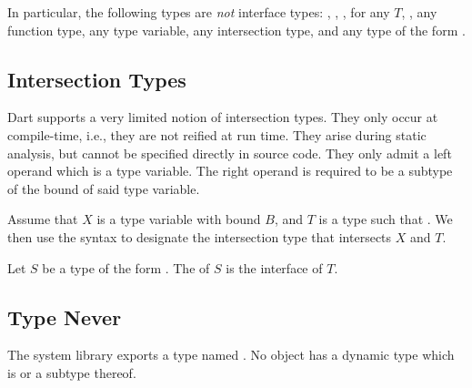 \documentclass[makeidx]{article}
\begin{document}
{{In particular, the following types are \emph{not} interface types:
\VOID, \DYNAMIC, \FUNCTION,  for any $T$, ,
any function type, any type variable, any intersection type,
and any type of the form .%
}


\subsection{Intersection Types}

\LMHash{}%
Dart supports a very limited notion of intersection types.
They only occur at compile-time, i.e., they are not reified at run time.
They arise during static analysis,
but cannot be specified directly in source code.
They only admit a left operand which is a type variable.
The right operand is required to be a subtype of
the bound of said type variable.


\LMHash{}%
Assume that $X$ is a type variable with bound $B$,
and $T$ is a type such that .
We then use the syntax  to designate the intersection type
that intersects $X$ and $T$.


\LMHash{}%
Let $S$ be a type of the form .
The 
of $S$ is the interface of $T$.


\subsection{Type Never}

\LMHash{}%
The system library  exports a type named .
No object has a dynamic type which is  or a subtype thereof.

}
\end{document}
